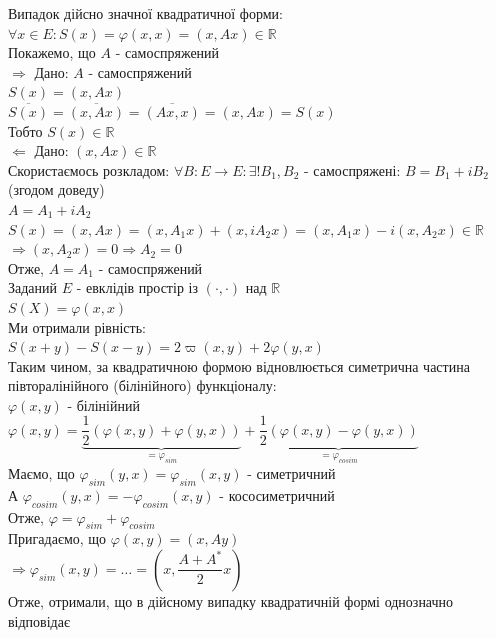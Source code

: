 Випадок дійсно значної квадратичної форми:\\
$\forall x \in E: S(x) = \varphi(x,x) = (x,Ax) \in \mathbb{R}$\\
Покажемо, що $A$ - самоспряжений\\
$\boxed{\Rightarrow}$ Дано: $A$ - самоспряжений\\
$S(x) = (x,Ax)$\\
$\overline{S(x)} = \overline{(x,Ax)} = \overline{(Ax,x)} = (x,Ax) = S(x)$\\
Тобто $S(x) \in \mathbb{R}$
\bigskip \\
$\boxed{\Leftarrow}$ Дано: $(x,Ax) \in \mathbb{R}$\\
Скористаємось розкладом: $\forall B: E \to E: \exists ! B_1,B_2$ - самоспряжені: $B = B_1 + i B_2$ (згодом доведу)\\
$A = A_1 + i A_2$\\
$S(x) = (x,Ax)= (x,A_1x) + (x,iA_2x) = (x,A_1x) - i(x,A_2x) \in \mathbb{R}$\\
$\Rightarrow (x,A_2x) = 0 \Rightarrow A_2 = 0$\\
Отже, $A = A_1$ - самоспряжений
\bigskip \\
Заданий $E$ - евклідів простір із $(\cdot, \cdot)$ над $\mathbb{R}$\\
$S(X) = \varphi(x,x)$\\
Ми отримали рівність:\\
$S(x+y)-S(x-y) = 2\varpi(x,y) + 2\varphi(y,x)$\\
Таким чином, за квадратичною формою відновлюється симетрична частина півторалінійного (білінійного) функціоналу:\\
$\varphi(x,y)$ - білінійний\\
$\varphi(x,y) =  \underbrace{\dfrac{1}{2} \left(\varphi(x,y) + \varphi(y,x) \right)}_{= \varphi_{sim}} + \underbrace{\dfrac{1}{2} \left(\varphi(x,y) - \varphi(y,x) \right)}_{= \varphi_{cosim}}$\\
Маємо, що $\varphi_{sim}(y,x) = \varphi_{sim}(x,y)$ - симетричний\\
А $\varphi_{cosim}(y,x) = -\varphi_{cosim}(x,y)$ - кососиметричний\\
Отже, $\varphi = \varphi_{sim} + \varphi_{cosim}$\\
Пригадаємо, що $\varphi(x,y) = (x,Ay)$\\
$\Rightarrow \varphi_{sim}(x,y) = \dots = \left(x, \dfrac{A+A^*}{2}x \right)$\\
Отже, отримали, що в дійсному випадку квадратичній формі однозначно відповідає\\
